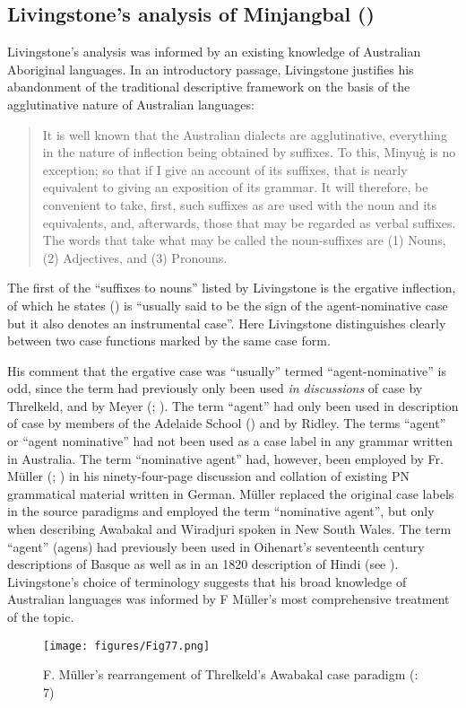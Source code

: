 \subsection{Livingstone’s analysis of Minjangbal (\citeyear{livingstone_grammar_1892})}
\label{sec:key:4.6.1}

Livingstone’s analysis was informed by an existing knowledge of Australian Aboriginal languages. In an introductory passage, Livingstone justifies his abandonment of the traditional descriptive framework on the basis of the agglutinative nature of Australian languages:
\begin{quote}
    It is well known that the Australian dialects are agglutinative, everything in the nature of inflection being obtained by suffixes. To this, Minyuġ is no exception; so that if I give an account of its suffixes, that is nearly equivalent to giving an exposition of its grammar. It will therefore, be convenient to take, first, such suffixes as are used with the noun and its equivalents, and, afterwards, those that may be regarded as verbal suffixes. The words that take what may be called the noun-suffixes are (1) Nouns, (2) Adjectives, and (3) Pronouns. \citep[3]{livingstone_grammar_1892}
\end{quote}

The first of the “suffixes to nouns” listed by Livingstone is the ergative inflection, of which he states (\citeyear[9]{livingstone_grammar_1892}) is “usually said to be the sign of the agent-nominative case but it also denotes an instrumental case”. Here Livingstone distinguishes clearly between two case functions marked by the same case form. 

His comment that the ergative case was “usually” termed “agent-nominative” is odd, since the term had previously only been used \textit{in discussions} of case by Threlkeld, and by Meyer (\citeyear[38]{meyer_vocabulary_1843}; ). The term “agent” had only been used in description of case by members of the Adelaide School () and by Ridley. The terms “agent” or “agent nominative” had not been used as a case label in any grammar written in Australia. The term “nominative agent” had, however, been employed by Fr. Müller (\citeyear[7, 20]{muller_grundris_1882}; ) in his ninety-four-page discussion and collation of existing PN grammatical material written in German. Müller replaced the original case labels in the source paradigms and employed the term ``nominative agent'', but only when describing Awabakal and Wiradjuri spoken in New South Wales. The term “agent” (agens) had previously been used in Oihenart’s seventeenth century descriptions of Basque as well as in an 1820 description of Hindi (see \citealt[198]{lindner_komposition_2013}). Livingstone’s choice of terminology suggests that his broad knowledge of Australian languages was informed by F Müller’s most comprehensive treatment of the topic.
\begin{figure}
\texttt{[image: figures/Fig77.png]}
\caption{F. Müller's rearrangement of Threlkeld's Awabakal case paradigm (\citeyear{muller_grundris_1882}: 7)}
\label{fig:4:77}
\end{figure}


